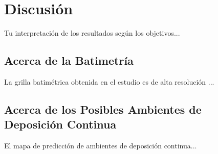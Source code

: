 \chapter{Discusión}
\thispagestyle{empty}

Tu interpretación de los resultados según los objetivos...

\section{Acerca de la Batimetría}

La grilla batimétrica obtenida en el estudio es de alta resolución ...

\section{Acerca de los Posibles Ambientes de Deposición Continua}

El mapa de predicción de ambientes de deposición continua...
